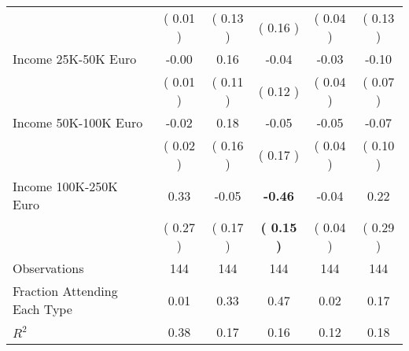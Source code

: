 \begin{table}[H]
{\begin{tabular}{lccccc}
\quad  & (     0.01 ) & (     0.13 )  & (     0.16 )  & (     0.04 ) & (     0.13 ) \\
\quad Income 25K-50K Euro &     -0.00 &      0.16 &     -0.04 &     -0.03 &     -0.10 \\
\quad  & (     0.01 ) & (     0.11 )  & (     0.12 )  & (     0.04 ) & (     0.07 ) \\
\quad Income 50K-100K Euro &     -0.02 &      0.18 &     -0.05 &     -0.05 &     -0.07 \\
\quad  & (     0.02 ) & (     0.16 )  & (     0.17 )  & (     0.04 ) & (     0.10 ) \\
\quad Income 100K-250K Euro &      0.33 &     -0.05 & \textbf{    -0.46} &     -0.04 &      0.22 \\
\quad  & (     0.27 ) & (     0.17 )  & \textbf{(     0.15 )}  & (     0.04 ) & (     0.29 ) \\
\midrule
Observations & 144 & 144 & 144 & 144 & 144 \\
Fraction Attending Each Type &      0.01 &      0.33 &      0.47 &      0.02 &      0.17 \\
\midrule
$ R^2$ &      0.38 &      0.17 &      0.16 &      0.12 &      0.18 \\
\bottomrule
\end{tabular}}
\end{table}

